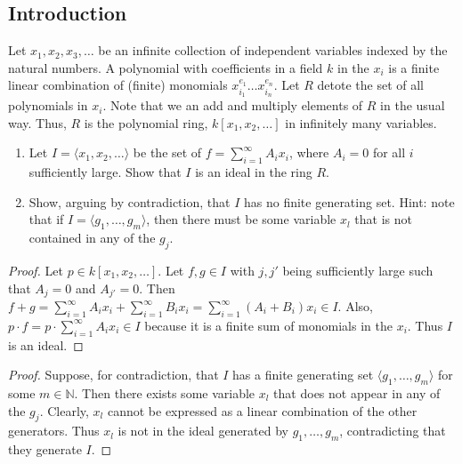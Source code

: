 \subsection{Introduction}

\begin{tcolorbox}[title=Problem 4, breakable]
    Let $x_1, x_2, x_3, \ldots$  be an infinite collection of independent
    variables indexed by the natural numbers. A  polynomial with coefficients 
    in a field $k$ in the $x_i$  is a finite linear combination of (finite)
    monomials $x_{i_1}^{e_1} \ldots x_{i_n}^{e_n}$. Let $R$ detote the set of all 
    polynomials in $x_i$. Note that we an add and multiply elements of $R$ in the usual 
    way. Thus, $R$ is the polynomial ring, $k[x_1, x_2, \ldots]$ in infinitely many variables.
    \begin{enumerate}
        \item Let $I = \langle x_1, x_2, \ldots \rangle$ be the set of $f = \sum_{i = 1}^{\infty} A_i x_i$,
        where $A_i = 0$ for all $i$ sufficiently large. Show that $I$ is an ideal in the ring $R$.
        \item Show, arguing by contradiction, that $I$ has no finite generating set. Hint: note that 
        if $I = \langle g_1, \ldots, g_m \rangle$, then there must be some variable $x_l$ that is not contained
        in any of the $g_j$.
    \end{enumerate}
\end{tcolorbox}

\begin{proof}
    Let $p \in k[x_1, x_2, \ldots]$.
    Let $f, g \in I$ with $j, j'$ being sufficiently large such that $A_j = 0$ and $A_{j'} = 0$.
    Then $f + g = \sum_{i = 1}^{\infty} A_i x_i + \sum_{i = 1}^{\infty} B_i x_i = \sum_{i = 1}^{\infty} (A_i + B_i) x_i \in I$.
    Also, $p \cdot f = p \cdot \sum_{i = 1}^{\infty} A_i x_i \in I$ because it is a finite sum of monomials in the $x_i$.
    Thus $I$ is an ideal.
\end{proof}

\begin{proof}
    Suppose, for contradiction, that $I$ has a finite generating set $\langle g_1, \ldots, g_m \rangle$
        for some $m \in \mathbb{N}$.
    Then there exists some variable $x_l$ that does not appear in any of the $g_j$.
    Clearly, $x_l$ cannot be expressed as a linear combination of the other generators.
    Thus $x_l$ is not in the ideal generated by $g_1, \ldots, g_m$, contradicting that they generate $I$.
\end{proof}


